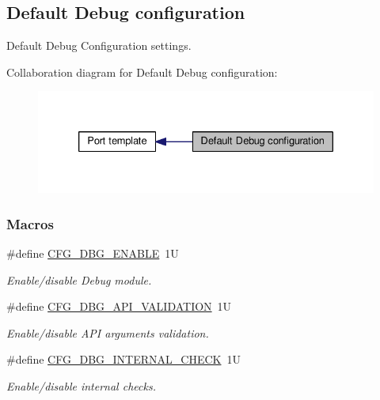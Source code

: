 \hypertarget{group__template__dbg__cfg}{\subsection{Default Debug configuration}
\label{group__template__dbg__cfg}
}


Default Debug Configuration settings.  


Collaboration diagram for Default Debug configuration\-:\nopagebreak
\begin{figure}[H]
\begin{center}
\leavevmode
\includegraphics[width=330pt]{group__template__dbg__cfg}
\end{center}
\end{figure}
\subsubsection*{Macros}
\begin{DoxyCompactItemize}
\item 
\#define \hyperlink{group__template__dbg__cfg_ga2ee37a5fa7efdba7d0014328e6c623a8}{C\-F\-G\-\_\-\-D\-B\-G\-\_\-\-E\-N\-A\-B\-L\-E}~1\-U
\begin{DoxyCompactList}\small\item\em Enable/disable Debug module. \end{DoxyCompactList}\item 
\#define \hyperlink{group__template__dbg__cfg_ga64e39c477ef9d900b82585150329e3f0}{C\-F\-G\-\_\-\-D\-B\-G\-\_\-\-A\-P\-I\-\_\-\-V\-A\-L\-I\-D\-A\-T\-I\-O\-N}~1\-U
\begin{DoxyCompactList}\small\item\em Enable/disable A\-P\-I arguments validation. \end{DoxyCompactList}\item 
\#define \hyperlink{group__template__dbg__cfg_ga530daa344716eca7cf87075dd7a8fca1}{C\-F\-G\-\_\-\-D\-B\-G\-\_\-\-I\-N\-T\-E\-R\-N\-A\-L\-\_\-\-C\-H\-E\-C\-K}~1\-U
\begin{DoxyCompactList}\small\item\em Enable/disable internal checks. \end{DoxyCompactList}\end{DoxyCompactItemize}



